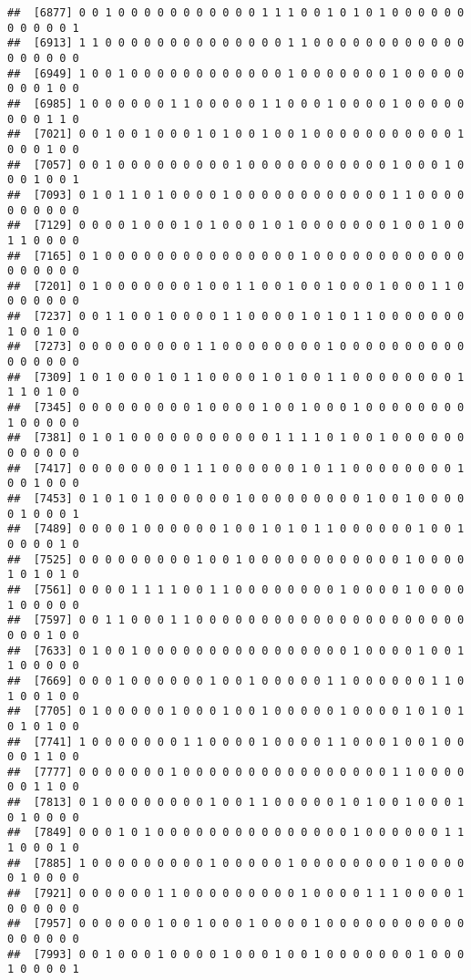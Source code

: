 \documentclass[
]{article}
\begin{document}
\begin{verbatim}
##  [6877] 0 0 1 0 0 0 0 0 0 0 0 0 0 0 1 1 1 0 0 1 0 1 0 1 0 0 0 0 0 0 0 0 0 0 0 1
##  [6913] 1 1 0 0 0 0 0 0 0 0 0 0 0 0 0 0 1 1 0 0 0 0 0 0 0 0 0 0 0 0 0 0 0 0 0 0
##  [6949] 1 0 0 1 0 0 0 0 0 0 0 0 0 0 0 0 1 0 0 0 0 0 0 0 1 0 0 0 0 0 0 0 0 1 0 0
##  [6985] 1 0 0 0 0 0 0 1 1 0 0 0 0 0 1 1 0 0 0 1 0 0 0 0 1 0 0 0 0 0 0 0 0 1 1 0
##  [7021] 0 0 1 0 0 1 0 0 0 1 0 1 0 0 1 0 0 1 0 0 0 0 0 0 0 0 0 0 0 1 0 0 0 1 0 0
##  [7057] 0 0 1 0 0 0 0 0 0 0 0 0 1 0 0 0 0 0 0 0 0 0 0 0 1 0 0 0 1 0 0 0 1 0 0 1
##  [7093] 0 1 0 1 1 0 1 0 0 0 0 1 0 0 0 0 0 0 0 0 0 0 0 0 1 1 0 0 0 0 0 0 0 0 0 0
##  [7129] 0 0 0 0 1 0 0 0 1 0 1 0 0 0 1 0 1 0 0 0 0 0 0 0 1 0 0 1 0 0 1 1 0 0 0 0
##  [7165] 0 1 0 0 0 0 0 0 0 0 0 0 0 0 0 0 0 1 0 0 0 0 0 0 0 0 0 0 0 0 0 0 0 0 0 0
##  [7201] 0 1 0 0 0 0 0 0 0 1 0 0 1 1 0 0 1 0 0 1 0 0 0 1 0 0 0 1 1 0 0 0 0 0 0 0
##  [7237] 0 0 1 1 0 0 1 0 0 0 0 1 1 0 0 0 0 1 0 1 0 1 1 0 0 0 0 0 0 0 1 0 0 1 0 0
##  [7273] 0 0 0 0 0 0 0 0 0 1 1 0 0 0 0 0 0 0 0 1 0 0 0 0 0 0 0 0 0 0 0 0 0 0 0 0
##  [7309] 1 0 1 0 0 0 1 0 1 1 0 0 0 0 1 0 1 0 0 1 1 0 0 0 0 0 0 0 0 1 1 1 0 1 0 0
##  [7345] 0 0 0 0 0 0 0 0 0 1 0 0 0 0 1 0 0 1 0 0 0 1 0 0 0 0 0 0 0 0 1 0 0 0 0 0
##  [7381] 0 1 0 1 0 0 0 0 0 0 0 0 0 0 0 1 1 1 1 0 1 0 0 1 0 0 0 0 0 0 0 0 0 0 0 0
##  [7417] 0 0 0 0 0 0 0 0 1 1 1 0 0 0 0 0 0 1 0 1 1 0 0 0 0 0 0 0 0 1 0 0 1 0 0 0
##  [7453] 0 1 0 1 0 1 0 0 0 0 0 0 1 0 0 0 0 0 0 0 0 0 1 0 0 1 0 0 0 0 0 1 0 0 0 1
##  [7489] 0 0 0 0 1 0 0 0 0 0 0 1 0 0 1 0 1 0 1 1 0 0 0 0 0 0 1 0 0 1 0 0 0 0 1 0
##  [7525] 0 0 0 0 0 0 0 0 0 1 0 0 1 0 0 0 0 0 0 0 0 0 0 0 0 1 0 0 0 0 1 0 1 0 1 0
##  [7561] 0 0 0 0 1 1 1 1 0 0 1 1 0 0 0 0 0 0 0 0 1 0 0 0 0 1 0 0 0 0 1 0 0 0 0 0
##  [7597] 0 0 1 1 0 0 0 1 1 0 0 0 0 0 0 0 0 0 0 0 0 0 0 0 0 0 0 0 0 0 0 0 0 1 0 0
##  [7633] 0 1 0 0 1 0 0 0 0 0 0 0 0 0 0 0 0 0 0 0 0 1 0 0 0 0 1 0 0 1 1 0 0 0 0 0
##  [7669] 0 0 0 1 0 0 0 0 0 0 1 0 0 1 0 0 0 0 0 1 1 0 0 0 0 0 0 1 1 0 1 0 0 1 0 0
##  [7705] 0 1 0 0 0 0 0 1 0 0 0 1 0 0 1 0 0 0 0 0 1 0 0 0 0 1 0 1 0 1 0 1 0 1 0 0
##  [7741] 1 0 0 0 0 0 0 0 1 1 0 0 0 0 1 0 0 0 0 1 1 0 0 0 1 0 0 1 0 0 0 0 1 1 0 0
##  [7777] 0 0 0 0 0 0 0 1 0 0 0 0 0 0 0 0 0 0 0 0 0 0 0 0 1 1 0 0 0 0 0 0 1 1 0 0
##  [7813] 0 1 0 0 0 0 0 0 0 0 1 0 0 1 1 0 0 0 0 0 1 0 1 0 0 1 0 0 0 1 0 1 0 0 0 0
##  [7849] 0 0 0 1 0 1 0 0 0 0 0 0 0 0 0 0 0 0 0 0 0 1 0 0 0 0 0 0 1 1 1 0 0 0 1 0
##  [7885] 1 0 0 0 0 0 0 0 0 0 1 0 0 0 0 0 1 0 0 0 0 0 0 0 0 1 0 0 0 0 0 1 0 0 0 0
##  [7921] 0 0 0 0 0 0 1 1 0 0 0 0 0 0 0 0 0 1 0 0 0 0 1 1 1 0 0 0 0 1 0 0 0 0 0 0
##  [7957] 0 0 0 0 0 0 1 0 0 1 0 0 0 1 0 0 0 0 1 0 0 0 0 0 0 0 0 0 0 0 0 0 0 0 0 0
##  [7993] 0 0 1 0 0 0 1 0 0 0 0 1 0 0 0 1 0 0 1 0 0 0 0 0 0 0 1 0 0 0 1 0 0 0 0 1

\end{verbatim}
\end{document}
